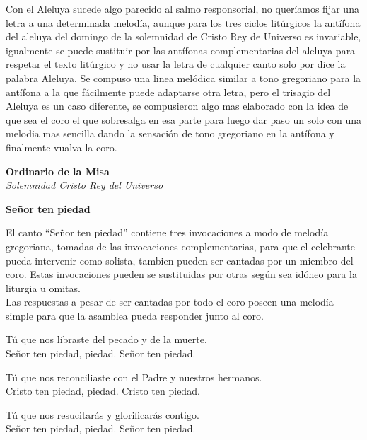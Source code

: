 \documentclass[12pt, letterpaper]{report}
\begin{document}
    Con el Aleluya sucede algo parecido al salmo responsorial, no quer\'iamos fijar una letra a una determinada melod\'ia, aunque para los tres ciclos lit\'urgicos la ant\'ifona del aleluya del domingo de la solemnidad de Cristo Rey de Universo es invariable, igualmente se puede sustituir por las ant\'ifonas complementarias del aleluya para respetar el texto lit\'urgico y no usar la letra de cualquier canto solo por dice la palabra Aleluya. Se compuso una linea mel\'odica similar a tono gregoriano para la ant\'ifona a la que f\'acilmente puede adaptarse otra letra,
    pero el trisagio del Aleluya es un caso diferente, se compusieron algo mas elaborado con la idea de que sea el coro el que sobresalga en esa parte para luego dar paso un solo con una melodia mas sencilla dando la sensaci\'on de tono gregoriano en la ant\'ifona y finalmente vualva la coro.
    \clearpage

    \begin{center}
      \vspace*{8cm}
      \textbf{\Huge Ordinario de la Misa}\\
      \textit{\Large Solemnidad Cristo Rey del Universo}
    \end{center}
    \clearpage

    \begin{center}
      \LARGE \textbf{Se\~nor ten piedad}
    \end{center}

    \Large { El canto ``Se\~nor ten piedad'' contiene tres invocaciones a modo de melod\'ia gregoriana, tomadas de las invocaciones complementarias, para que el celebrante pueda intervenir como solista, tambien pueden ser cantadas por un miembro del coro. Estas invocaciones pueden se sustituidas por otras seg\'un sea id\'oneo para la liturgia u omitas.\\ Las respuestas a pesar de ser cantadas por todo el coro poseen una melod\'ia simple para que la asamblea pueda responder junto al coro. }

    \noindent
    \LARGE T\'u que nos libraste del pecado y de la muerte.\\ Se\~nor ten piedad, piedad. Se\~nor ten piedad.

    \noindent
    \LARGE T\'u que nos reconciliaste con el Padre y nuestros hermanos.\\ Cristo ten piedad, piedad. Cristo ten piedad.

    \noindent
    \LARGE T\'u que nos resucitar\'as y glorificar\'as contigo.\\ Se\~nor ten piedad, piedad. Se\~nor ten piedad.
    \clearpage
\end{document}
